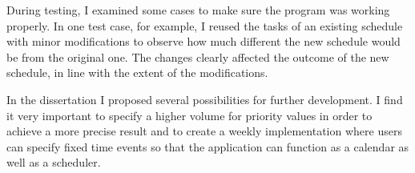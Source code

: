 During testing, I examined some cases to make sure the program was working properly. In one test case, for example, I reused the tasks of an existing schedule with minor modifications to observe how much different the new schedule would be from the original one. The changes clearly affected the outcome of the new schedule, in line with the extent of the modifications.

In the dissertation I proposed several possibilities for further development. I find it very important to specify a higher volume for priority values in order to achieve a more precise result and to create a weekly implementation where users can specify fixed time events so that the application can function as a calendar as well as a scheduler.
